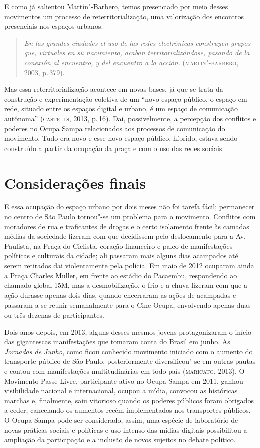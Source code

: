 E como já salientou Martín"-Barbero, temos presenciado por meio desses
movimentos um processo de reterritorialização, uma valorização dos
encontros presenciais nos espaços urbanos:

\begin{quote}
\emph{En las grandes ciudades el uso de las redes electrónicas
construyen grupos que, virtuales en su nacimiento, acaban
territorializándose, pasando de la conexión al encuentro, y del
encuentro a la acción.} (\textsc{martín"-barbero}, 2003, p.\,379).
\end{quote}

Mas essa reterritorialização acontece em novas bases, já que se trata da
construção e experimentação coletiva de um ``novo espaço público, o
espaço em rede, situado entre os espaços digital e urbano, é um espaço
de comunicação autônoma'' (\textsc{castells}, 2013, p.\,16). Daí, possivelmente, a
percepção dos conflitos e poderes no Ocupa Sampa relacionados aos
processos de comunicação do movimento. Tudo era novo e esse novo espaço
público, híbrido, estava sendo construído a partir da ocupação da praça
e com o uso das redes sociais.

\section{Considerações finais}

E essa ocupação do espaço urbano por dois meses não foi tarefa fácil;
permanecer no centro de São Paulo tornou"-se um problema para o
movimento. Conflitos com moradores de rua e traficantes de drogas e o
certo isolamento frente às camadas médias da sociedade fizeram com que
decidissem pelo deslocamento para a Av. Paulista, na Praça do Ciclista,
coração financeiro e palco de manifestações políticas e culturais da
cidade; ali passaram mais alguns dias acampados até serem retirados dai
violentamente pela polícia. Em maio de 2012 ocuparam ainda a Praça
Charles Muller, em frente ao estádio do Pacaembu, respondendo ao chamado
global 15M, mas a desmobilização, o frio e a chuva fizeram com que a
ação durasse apenas dois dias, quando encerraram as ações de acampadas e
passaram a se reunir semanalmente para o Cine Ocupa, envolvendo apenas
duas ou três dezenas de participantes.

Dois anos depois, em 2013, alguns desses mesmos jovens
protagonizaram o início das gigantescas manifestações que tomaram conta
do Brasil em junho. As \emph{Jornadas de Junho}, como ficou conhecido
movimento iniciado com o aumento do transporte público de São Paulo,
posteriormente diversificou"-se em outras pautas e contou com
manifestações multitudinárias em todo país (\textsc{maricato}, 2013). O Movimento
Passe Livre, participante ativo no Ocupa Sampa em 2011, ganhou
visibilidade nacional e internacional, ocupou a mídia, convocou as
históricas marchas e, finalmente, saiu vitorioso quando os poderes
públicos foram obrigados a ceder, cancelando os aumentos recém
implementados nos transportes públicos. O Ocupa Sampa pode ser
considerado, assim, uma espécie de laboratório de novas práticas sociais
e políticas e uso intenso das mídias digitais possibilitou a ampliação
da participação e a inclusão de novos sujeitos no debate político.

